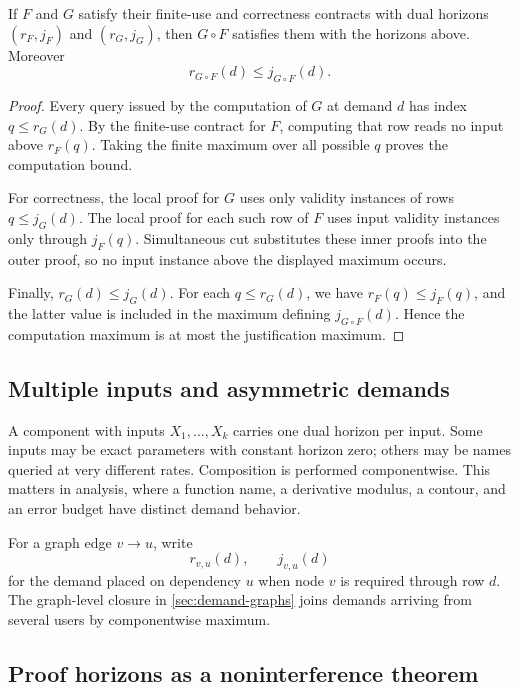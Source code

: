 \begin{theorem}
\label{thm:dual-compose}
If \(F\) and \(G\) satisfy their finite-use and correctness contracts with dual
horizons \((r_F,j_F)\) and \((r_G,j_G)\), then \(G\circ F\) satisfies them with the
horizons above.  Moreover
\[
   r_{G\circ F}(d)\le j_{G\circ F}(d).
\]
\end{theorem}

\begin{proof}
Every query issued by the computation of \(G\) at demand \(d\) has index
\(q\le r_G(d)\).  By the finite-use contract for \(F\), computing that row reads no
input above \(r_F(q)\).  Taking the finite maximum over all possible \(q\) proves the
computation bound.

For correctness, the local proof for \(G\) uses only validity instances of rows
\(q\le j_G(d)\).  The local proof for each such row of \(F\) uses input validity
instances only through \(j_F(q)\).  Simultaneous cut substitutes these inner
proofs into the outer proof, so no input instance above the displayed maximum occurs.

Finally, \(r_G(d)\le j_G(d)\).  For each \(q\le r_G(d)\), we have
\(r_F(q)\le j_F(q)\), and the latter value is included in the maximum defining
\(j_{G\circ F}(d)\).  Hence the computation maximum is at most the justification
maximum.
\end{proof}

\subsection{Multiple inputs and asymmetric demands}

A component with inputs \(X_1,\ldots,X_k\) carries one dual horizon per input.  Some
inputs may be exact parameters with constant horizon zero; others may be names queried
at very different rates.  Composition is performed componentwise.  This matters in
analysis, where a function name, a derivative modulus, a contour, and an error budget
have distinct demand behavior.

For a graph edge \(v\to u\), write
\[
   r_{v,u}(d),\qquad j_{v,u}(d)
\]
for the demand placed on dependency \(u\) when node \(v\) is required through row
\(d\).  The graph-level closure in \cref{sec:demand-graphs} joins demands arriving
from several users by componentwise maximum.

\subsection{Proof horizons as a noninterference theorem}

